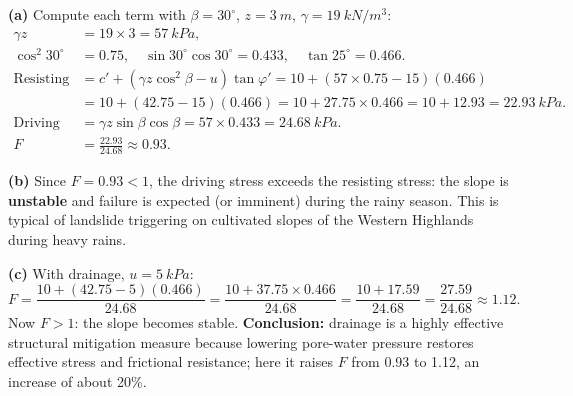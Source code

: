 \documentclass[11pt]{article}
\begin{document}
\begin{corrige}
\textbf{(a)} Compute each term with $\beta = 30^{\circ}$, $z = \SI{3}{m}$, $\gamma = \SI{19}{kN/m^3}$:
\begin{align*}
\gamma z &= 19 \times 3 = \SI{57}{kPa},\\
\cos^2 30^{\circ} &= 0.75, \quad \sin 30^{\circ}\cos 30^{\circ} = 0.433, \quad \tan 25^{\circ} = 0.466.\\
\text{Resisting stress} &= c' + (\gamma z\cos^2\beta - u)\tan\varphi' = 10 + (57 \times 0.75 - 15)(0.466)\\
&= 10 + (42.75 - 15)(0.466) = 10 + 27.75 \times 0.466 = 10 + 12.93 = \SI{22.93}{kPa}.\\
\text{Driving stress} &= \gamma z \sin\beta\cos\beta = 57 \times 0.433 = \SI{24.68}{kPa}.\\
F &= \frac{22.93}{24.68} \approx 0.93.
\end{align*}

\textbf{(b)} Since $F = 0.93 < 1$, the driving stress exceeds the resisting stress: the slope is \textbf{unstable} and failure is expected (or imminent) during the rainy season. This is typical of landslide triggering on cultivated slopes of the Western Highlands during heavy rains.

\textbf{(c)} With drainage, $u = \SI{5}{kPa}$:
\[ F = \frac{10 + (42.75 - 5)(0.466)}{24.68} = \frac{10 + 37.75 \times 0.466}{24.68} = \frac{10 + 17.59}{24.68} = \frac{27.59}{24.68} \approx 1.12. \]
Now $F > 1$: the slope becomes stable. \textbf{Conclusion:} drainage is a highly effective structural mitigation measure because lowering pore-water pressure restores effective stress and frictional resistance; here it raises $F$ from 0.93 to 1.12, an increase of about 20\%.
\end{corrige}
\end{document}
